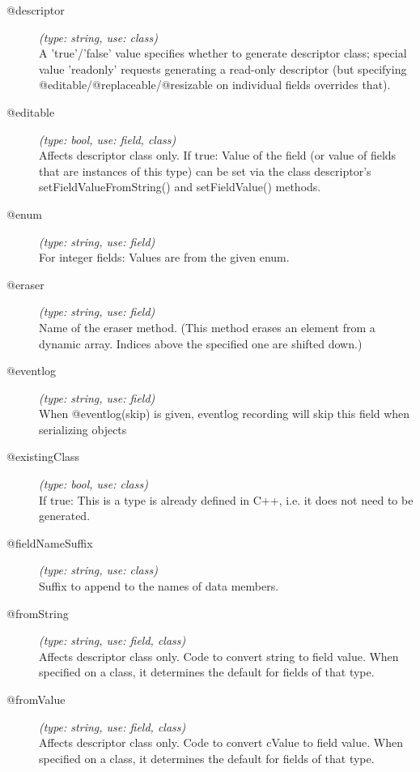 \begin{description}
\item[@descriptor] \textit{(type: string, use: class)} \\
  A 'true'/'false' value specifies whether to generate descriptor class;
  special value 'readonly' requests generating a read-only descriptor (but
  specifying @editable/@replaceable/@resizable on individual fields overrides
  that).

\item[@editable] \textit{(type: bool, use: field, class)} \\
  Affects descriptor class only. If true: Value of the field (or value of
  fields that are instances of this type) can be set via the class
  descriptor's setFieldValueFromString() and setFieldValue() methods.

\item[@enum] \textit{(type: string, use: field)} \\
  For integer fields: Values are from the given enum.

\item[@eraser] \textit{(type: string, use: field)} \\
  Name of the eraser method. (This method erases an element from a dynamic
  array. Indices above the specified one are shifted down.)

\item[@eventlog] \textit{(type: string, use: field)} \\
  When @eventlog(skip) is given, eventlog recording will skip this field when
  serializing objects

\item[@existingClass] \textit{(type: bool, use: class)} \\
  If true: This is a type is already defined in C++, i.e. it does not need to
  be generated.

\item[@fieldNameSuffix] \textit{(type: string, use: class)} \\
  Suffix to append to the names of data members.

\item[@fromString] \textit{(type: string, use: field, class)} \\
  Affects descriptor class only. Code to convert string to field value. When
  specified on a class, it determines the default for fields of that type.

\item[@fromValue] \textit{(type: string, use: field, class)} \\
  Affects descriptor class only. Code to convert cValue to field value. When
  specified on a class, it determines the default for fields of that type.


\end{description}
